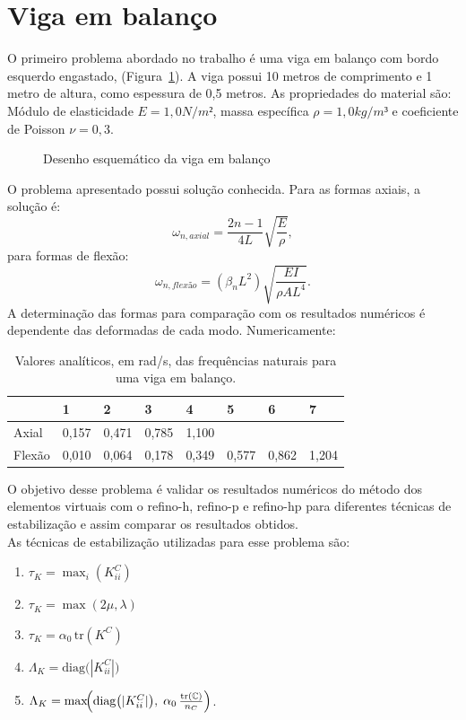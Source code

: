 \section{Viga em balanço}

\indent O primeiro problema abordado no trabalho é uma viga em balanço com bordo esquerdo engastado, (Figura~\ref{fig:5.1}). A viga possui 10 metros de comprimento e 1 metro de altura, como espessura de 0,5 metros. As propriedades do material são: Módulo de elasticidade $E = 1,0 N/m²$, massa específica $\rho = 1,0 kg/m³$ e coeficiente de Poisson $\nu = 0,3$.

\begin{figure}[htbp]
    \centering
    \caption{Desenho esquemático da viga em balanço}
    \label{fig:5.1}
    \resizebox{0.6\textwidth}{!}{}
\end{figure}

\indent O problema apresentado possui solução conhecida. Para as formas axiais, a solução é:
\begin{equation}
    \omega_{n,axial} = \frac{2n - 1}{4 L} \sqrt{\frac{E}{\rho}},
\end{equation}
para formas de flexão:
\begin{equation}
    \omega_{n,flexão} = (\beta_n L^2) \sqrt{\frac {E I}{\rho A L^4}}.
\end{equation}
A determinação das formas para comparação com os resultados numéricos é dependente das deformadas de cada modo. Numericamente:

\begin{table}[htbp!]
\centering
\caption{Valores analíticos, em rad/s, das frequências naturais para uma viga em balanço.}
\label{tab:5.1}
\begin{tabular}{@{}llllllll@{}}
\toprule
       & 1     & 2     & 3     & 4     & 5     & 6     & 7     \\ \midrule
Axial  & 0,157 & 0,471 & 0,785 & 1,100 &       &       &       \\
Flexão & 0,010 & 0,064 & 0,178 & 0,349 & 0,577 & 0,862 & 1,204 \\ \bottomrule
\end{tabular}
\end{table}

\indent O objetivo desse problema é validar os resultados numéricos do método dos elementos virtuais com o refino-h, refino-p e refino-hp para diferentes técnicas de estabilização e assim comparar os resultados obtidos.\\
\indent As técnicas de estabilização utilizadas para esse problema são:
\begin{enumerate}[label=\Roman*.]
    \item $\tau_K = \max_i(K^C_{ii})$ 
    \item $\tau_K = \max(2\mu,\lambda)$ 
    \item $\tau_K = \alpha_0\,\mathrm{tr}(K^C)$ 
    \item $\Lambda_K = \mathrm{diag}\bigl(|K^C_{ii}|\bigr)$ 
    \item $\Lambda_K = \max\!\Bigl(\mathrm{diag}\bigl(|K^C_{ii}|\bigr),\; \alpha_0\,\tfrac{\mathrm{tr}(\mathbb{C})}{n_C}\Bigr)$.
\end{enumerate}

